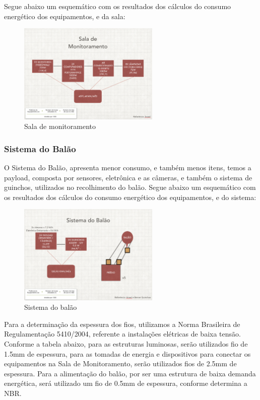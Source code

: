 Segue abaixo um esquemático com os resultados dos cálculos do consumo energético dos equipamentos, e da sala:

\begin{figure}[H]
	\centering
	\includegraphics[width=0.6\textwidth]{figuras/salaMonitoramento}
	\caption{Sala de monitoramento}
	\label{img:salaMonitoramento}
\end{figure}


\subsubsection{Sistema do Balão}

O Sistema do Balão, apresenta menor consumo, e também menos itens, temos a payload, composta por sensores, eletrônica e as câmeras, e também o sistema de guinchos, utilizados no recolhimento do balão.
Segue abaixo um esquemático com os resultados dos cálculos do consumo energético dos equipamentos, e do sistema:

\begin{figure}[H]
	\centering
	\includegraphics[width=0.6\textwidth]{figuras/sistemaBalao}
	\caption{Sistema do balão}
	\label{img:sistemaBalao}
\end{figure}


Para a determinação da espessura dos fios, utilizamos a Norma Brasileira de Regulamentação 5410/2004, referente a instalações elétricas de baixa tensão. Conforme a tabela abaixo, para as estruturas luminosas, serão utilizados fio de 1.5mm de espessura, para as tomadas de energia e dispositivos para conectar os equipamentos na Sala de Monitoramento, serão utilizados fios de 2.5mm de espessura. Para a alimentação do balão, por ser uma estrutura de baixa demanda energética, será utilizado um fio de 0.5mm de espessura, conforme determina a NBR.

